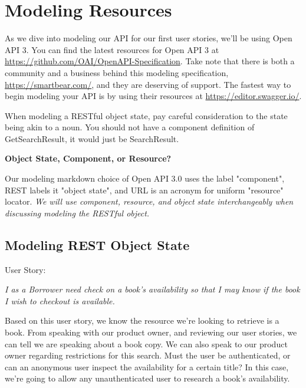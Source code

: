 \chapter{Modeling Resources}

As we dive into modeling our API for our first user stories, we'll be using Open API 3.  You can find the latest resources for Open API 3 at \url{https://github.com/OAI/OpenAPI-Specification}.  Take note that there is both a community and a business behind this modeling specification, \url{https://smartbear.com/}, and they are deserving of support.  The fastest way to begin modeling your API is by using their resources at \url{https://editor.swagger.io/}.

When modeling a RESTful object state, pay careful consideration to the state being akin to a noun.  You should not have a component definition of GetSearchResult, it would just be SearchResult.

\begin{sidebar}
\begin{center}
\textbf{Object State, Component, or Resource?}
\end{center}

Our modeling markdown choice of Open API 3.0 uses the label "component", REST labels it "object state", and URL is an acronym for uniform "resource" locator.  \textit{We will use component, resource, and object state interchangeably when discussing modeling the RESTful object.}

\end{sidebar}

\section{Modeling REST Object State}

User Story:

\textit{I as a Borrower need check on a book's availability so that I may know if the book I wish to checkout is available.}

Based on this user story, we know the resource we're looking to retrieve is a book.  From speaking with our product owner, and reviewing our user stories, we can tell we are speaking about a book copy.  We can also speak to our product owner regarding restrictions for this search.  Must the user be authenticated, or can an anonymous user inspect the availability for a certain title?  In this case, we're going to allow any unauthenticated user to research a book's availability.

